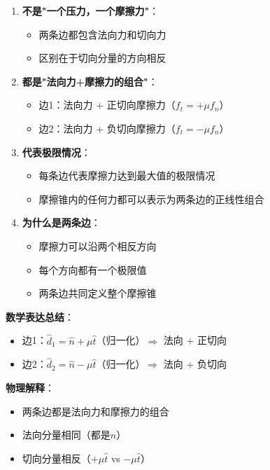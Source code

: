 \documentclass[12pt,a4paper]{article}
\begin{document}
\begin{enumerate}
\item \textbf{不是"一个压力，一个摩擦力"}：
   \begin{itemize}
   \item 两条边都包含法向力和切向力
   \item 区别在于切向分量的方向相反
   \end{itemize}

\item \textbf{都是"法向力+摩擦力的组合"}：
   \begin{itemize}
   \item 边1：法向力 + 正切向摩擦力（$f_t = +\mu f_n$）
   \item 边2：法向力 + 负切向摩擦力（$f_t = -\mu f_n$）
   \end{itemize}

\item \textbf{代表极限情况}：
   \begin{itemize}
   \item 每条边代表摩擦力达到最大值的极限情况
   \item 摩擦锥内的任何力都可以表示为两条边的正线性组合
   \end{itemize}

\item \textbf{为什么是两条边}：
   \begin{itemize}
   \item 摩擦力可以沿两个相反方向
   \item 每个方向都有一个极限值
   \item 两条边共同定义整个摩擦锥
   \end{itemize}
\end{enumerate}

\textbf{数学表达总结}：
\begin{itemize}
\item 边1：$\hat{d}_1 = \hat{n} + \mu \hat{t}$（归一化）$\Rightarrow$ 法向 + 正切向
\item 边2：$\hat{d}_2 = \hat{n} - \mu \hat{t}$（归一化）$\Rightarrow$ 法向 + 负切向
\end{itemize}

\textbf{物理解释}：
\begin{itemize}
\item 两条边都是法向力和摩擦力的组合
\item 法向分量相同（都是$\hat{n}$）
\item 切向分量相反（$+\mu \hat{t}$ vs $-\mu \hat{t}$）
\end{itemize}
\end{document}
